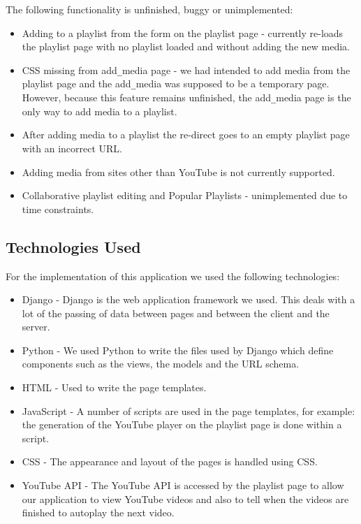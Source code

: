 \documentclass{sig-alt-release2}
\begin{document}

The following functionality is unfinished, buggy or unimplemented:

\begin{itemize}
\item Adding to a playlist from the form on the playlist page - currently re-loads the playlist page with no playlist loaded and without adding the new media.
\item CSS missing from add\verb=_=media page - we had intended to add media from the playlist page and the add\verb=_=media was supposed to be a temporary page. However, because this feature remains unfinished, the add\verb=_=media page is the only way to add media to a playlist.
\item After adding media to a playlist the re-direct goes to an empty playlist page with an incorrect URL.
\item Adding media from sites other than YouTube is not currently supported.
\item Collaborative playlist editing and Popular Playlists - unimplemented due to time constraints.
\end{itemize}

\subsection{Technologies Used}

For the implementation of this application we used the following technologies:

\begin{itemize}
\item Django - Django is the web application framework we used. This deals with a lot of the passing of data between pages and between the client and the server.
\item Python - We used Python to write the files used by Django which define components such as the views, the models and the URL schema. 
\item HTML - Used to write the page templates.
\item JavaScript - A number of scripts are used in the page templates, for example: the generation of the YouTube player on the playlist page is done within a script.
\item CSS - The appearance and layout of the pages is handled using CSS.
\item YouTube API - The YouTube API is accessed by the playlist page to allow our application to view YouTube videos and also to tell when the videos are finished to autoplay the next video.
\end{itemize}
\end{document}
